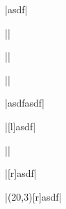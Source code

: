 \documentclass{minimal}
\begin{document}
|asdf|

||

||

||

|asdfasdf|

|[l]{asdf}|

||

|[r]{asdf}|


|\makebox(20,3)[r]{asdf}|
\end{document}
